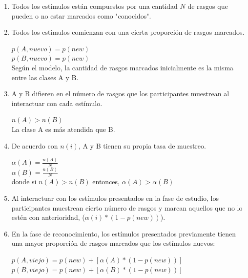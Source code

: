 \begin{enumerate}
\item Todos los estímulos están compuestos por una cantidad $N$ de rasgos que pueden o no estar marcados como "conocidos".\\

\item Todos los estímulos comienzan con una cierta proporción de rasgos marcados.\\
\begin{center}
$p(A,nuevo) = p(new)$\\
$p(B,nuevo) = p(new)$\\
Según el modelo, la cantidad de rasgos marcados inicialmente es la misma entre las clases A y B.\\
\end{center}

\item A y B difieren en el número de rasgos que los participantes muestrean al interactuar con cada estímulo.\\
\begin{center}
$n(A) > n(B)$\\
La clase A es más atendida que B.\\
\end{center}

\item De acuerdo con $n(i)$, A y B tienen su propia tasa de muestreo.\\
\begin{center}
$\alpha(A) = \frac{n(A)}{N}$\\
$\alpha(B) = \frac{n(B)}{N}$\\
donde si $n(A) > n(B)$ entonces, $\alpha(A) > \alpha(B)$\
\end{center}

\item Al interactuar con los estímulos presentados en la fase de estudio, los participantes muestrean cierto número de rasgos y marcan aquellos que no lo estén con anterioridad, ($\alpha(i)*(1-p(new))$).\\

\item En la fase de reconocimiento, los estímulos presentados previamente tienen una mayor proporción de rasgos marcados que los estímulos nuevos:\\
\begin{center}
$p(A,viejo) = p(new) + [\alpha(A)*(1-p(new))]$\\
$p(B,viejo) = p (new) + [\alpha(B)*(1-p(new))]$\\
\end{center}
\end{enumerate}

